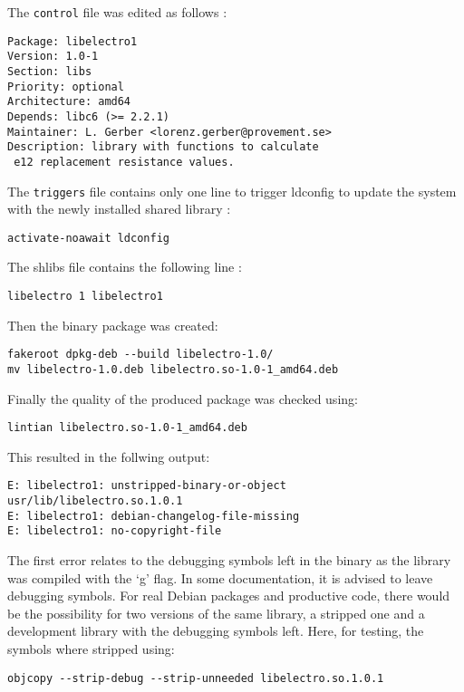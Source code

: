 \documentclass[a4paper,11pt,twoside]{article}
\begin{document}
The \verb+control+ file was edited as follows \cite{controlfiles}:
\begin{verbatim}
Package: libelectro1
Version: 1.0-1
Section: libs
Priority: optional
Architecture: amd64
Depends: libc6 (>= 2.2.1)
Maintainer: L. Gerber <lorenz.gerber@provement.se>
Description: library with functions to calculate
 e12 replacement resistance values.
\end{verbatim}

The \verb+triggers+ file contains only one line to trigger
ldconfig to update the system with the newly installed shared library \cite{debShlibs}:
\begin{verbatim}
activate-noawait ldconfig
\end{verbatim}

The shlibs file contains the following line \cite[8.6.4.2.]{debShlibs}:
\begin{verbatim}
libelectro 1 libelectro1
\end{verbatim}
Then the binary package was created:
\begin{verbatim}
fakeroot dpkg-deb --build libelectro-1.0/
mv libelectro-1.0.deb libelectro.so-1.0-1_amd64.deb
\end{verbatim}

Finally the quality of the produced package was checked using:
\begin{verbatim}
lintian libelectro.so-1.0-1_amd64.deb
\end{verbatim}

This resulted in the follwing output:
\begin{verbatim}
E: libelectro1: unstripped-binary-or-object usr/lib/libelectro.so.1.0.1
E: libelectro1: debian-changelog-file-missing
E: libelectro1: no-copyright-file
\end{verbatim}

The first error relates to the debugging symbols left in the binary as
the library was compiled with the `g' flag. In some documentation, it is
advised to leave debugging symbols. For real Debian packages and productive
code, there would be the possibility for two versions of the same library,
a stripped one and a development library with the debugging symbols left.
Here, for testing, the symbols where stripped using:

\begin{verbatim}
objcopy --strip-debug --strip-unneeded libelectro.so.1.0.1
\end{verbatim}
\end{document}
